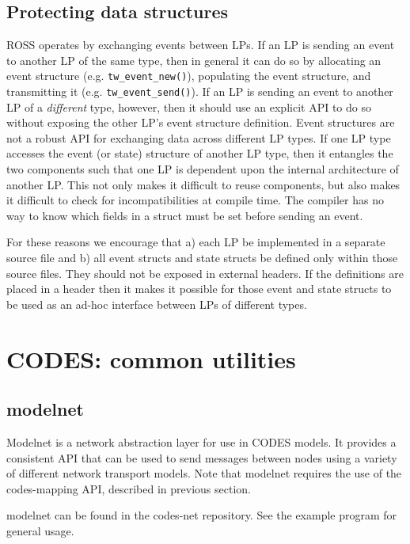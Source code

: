 \documentclass[conference,10pt,compsocconf,onecolumn]{IEEEtran}
\begin{document}
\subsection{Protecting data structures}

ROSS operates by exchanging events between LPs.  If an LP is sending
an event to another LP of the same type, then in general it can do so
by allocating an event structure (e.g. \texttt{tw\_event\_new()}),
populating the event structure, and transmitting it
(e.g. \texttt{tw\_event\_send()}).  If an LP is sending an event to
another LP of a \emph{different} type, however, then it should use an
explicit API to do so without exposing the other LP's event structure
definition.  Event structures are not a robust API for exchanging data
across different LP types.  If one LP type accesses the event (or state)
structure of another LP type, then it entangles the two components such
that one LP is dependent upon the internal architecture of another LP.
This not only makes it difficult to reuse components, but also makes it
difficult to check for incompatibilities at compile time.  The compiler
has no way to know which fields in a struct must be set before sending
an event.

For these reasons we encourage that a) each LP be implemented in a separate
source file and b) all event structs and state structs
be defined only within those source files.  They should not be exposed in external
headers.  If the definitions are placed in a header then it makes it
possible for those event and state structs to be used as an ad-hoc interface
between LPs of different types.

\section{CODES: common utilities}

\subsection{modelnet}

Modelnet is a network abstraction layer for use in CODES models. It provides a
consistent API that can be used to send messages between nodes using a variety
of different network transport models. Note that modelnet requires the use of
the codes-mapping API, described in previous section.

modelnet can be found in the codes-net repository. See the example program for
general usage.
\end{document}
